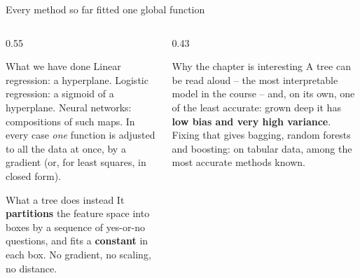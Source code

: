 \documentclass[10pt,aspectratio=169]{beamer}
\begin{document}
\begin{frame}{Every method so far fitted one global function}
\begin{columns}[T]
\begin{column}{0.55\textwidth}
\begin{block}{What we have done}
Linear regression: a hyperplane.  Logistic regression: a sigmoid of a
hyperplane.  Neural networks: compositions of such maps.  In every case
\emph{one} function is adjusted to all the data at once, by a gradient (or,
for least squares, in closed form).
\end{block}
\begin{block}{What a tree does instead}
It \textbf{partitions} the feature space into boxes by a sequence of
yes-or-no questions, and fits a \textbf{constant} in each box.  No gradient,
no scaling, no distance.
\end{block}
\end{column}
\begin{column}{0.43\textwidth}
\begin{block}{Why the chapter is interesting}
A tree can be read aloud -- the most interpretable model in the course --
and, on its own, one of the least accurate: grown deep it has \textbf{low
bias and very high variance}.  Fixing that gives bagging, random forests and
boosting: on tabular data, among the most accurate methods known.
\end{block}
\end{column}
\end{columns}
\end{frame}
\end{document}
